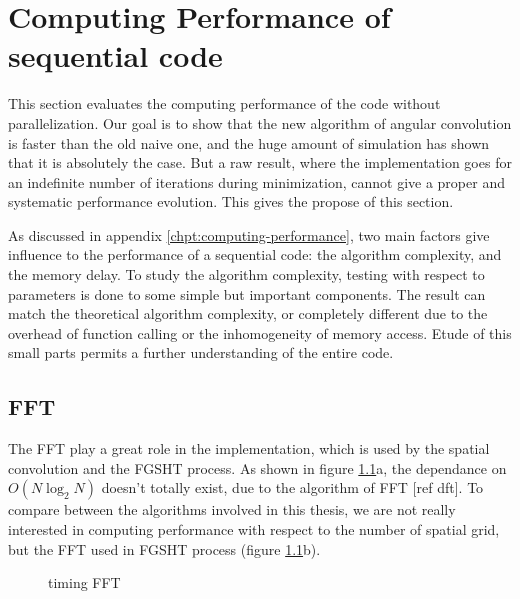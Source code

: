 
\chapter{Computing Performance of sequential code\label{chpt:seq-code-performance}}

This section evaluates the computing performance of the code without
parallelization. Our goal is to show that the new algorithm of angular
convolution is faster than the old naive one, and the huge amount
of simulation has shown that it is absolutely the case. But a raw
result, where the implementation goes for an indefinite number of
iterations during minimization, cannot give a proper and systematic
performance evolution. This gives the propose of this section. 

As discussed in appendix \ref{chpt:computing-performance}, two main
factors give influence to the performance of a sequential code: the
algorithm complexity, and the memory delay. To study the algorithm
complexity, testing with respect to parameters is done to some simple
but important components. The result can match the theoretical algorithm
complexity, or completely different due to the overhead of function
calling or the inhomogeneity of memory access. Etude of this small
parts permits a further understanding of the entire code.


\section{FFT}

The \acs{FFT} play a great role in the implementation, which is used
by the spatial convolution and the \acs{FGSHT} process. As shown
in figure \ref{fig:timing-FFT}a, the dependance on $O(N\log_{2}N)$
doesn't totally exist, due to the algorithm of FFT {[}ref dft{]}.
To compare between the algorithms involved in this thesis, we are
not really interested in computing performance with respect to the
number of spatial grid, but the \acs{FFT} used in \acs{FGSHT} process
(figure \ref{fig:timing-FFT}b). 

\begin{figure}[h]
\subfloat[angular]{}

\caption{timing FFT\label{fig:timing-FFT}}
\end{figure}



